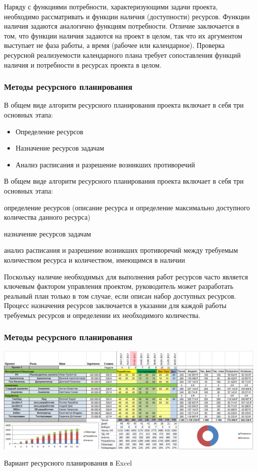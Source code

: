\documentclass{../industrial-development}
\begin{document}
Наряду с функциями потребности, характеризующими задачи проекта, необходимо рассматривать и функции наличия (доступности) ресурсов. Функции наличия задаются аналогично функциям потребности. Отличие заключается в том, что функции наличия задаются на проект в целом, так что их аргументом выступает не фаза работы, а время (рабочее или календарное). Проверка ресурсной реализуемости календарного плана требует сопоставления функций наличия и потребности в ресурсах проекта в целом.

    \begin{frame} \frametitle{Методы ресурсного планирования}
	В общем виде алгоритм ресурсного планирования проекта включает в себя три основных этапа:
	\begin{itemize}
		\item Определение ресурсов
		\item Назначение ресурсов задачам 
		\item Анализ расписания и разрешение возникших противоречий
	\end{itemize}
    \end{frame}
    \lecturenotes 

В общем виде алгоритм ресурсного планирования проекта включает в себя три основных этапа:

определение ресурсов (описание ресурса и определение максимально доступного количества данного ресурса)

назначение ресурсов задачам

анализ расписания и разрешение возникших противоречий между требуемым количеством ресурса и количеством, имеющимся в наличии

Поскольку наличие необходимых для выполнения работ ресурсов часто является ключевым фактором управления проектом, руководитель может разработать реальный план только в том случае, если описан набор доступных ресурсов. Процесс назначения ресурсов заключается в указании для каждой работы требуемых ресурсов и определении их необходимого количества.

    \begin{frame} \frametitle{Методы ресурсного планирования}
         \centerline{\includegraphics[width=1\textwidth]{resource.png}}
	\centerline{Вариант ресурсного планирования в Excel}
    \end{frame}
    \lecturenotes
\end{document}
